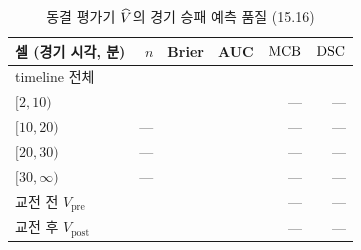 \begin{table}[!t]
  \centering
  \caption{동결 평가기 $\widehat V$의 경기 승패 예측 품질 (15.16)}
  \label{tab:vw-quality}
  \small
  \begin{tabular}{@{}lrrrrr@{}}
    \toprule
    셀 (경기 시각, 분) & $n$ & Brier & AUC & $\operatorname{MCB}$ & $\operatorname{DSC}$ \\
    \midrule
    timeline 전체 & \numVTest{} & \vwBrier{} & \vwAUC{} & \vwMCB{} & \vwDSC{} \\
    $[2,10)$ & \numVEarly{} & \vwEarlyBrier{} & \vwEarlyAUC{} & --- & --- \\
    $[10,20)$ & --- & \vwMidBrier{} & \vwMidAUC{} & --- & --- \\
    $[20,30)$ & --- & \vwLateBrier{} & \vwLateAUC{} & --- & --- \\
    $[30,\infty)$ & --- & \vwVeryLateBrier{} & \vwVeryLateAUC{} & --- & --- \\
    \midrule
    교전 전 $V_{\mathrm{pre}}$ & \numTTest{} & \vpreBrier{} & \vpreAUC{} & --- & --- \\
    교전 후 $V_{\mathrm{post}}$ & \numTTest{} & \vpostBrier{} & \vpostAUC{} & --- & --- \\
    \bottomrule
  \end{tabular}
\end{table}
